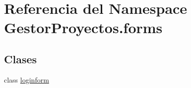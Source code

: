 \hypertarget{namespace_gestor_proyectos_1_1forms}{}\section{Referencia del Namespace Gestor\+Proyectos.\+forms}
\label{namespace_gestor_proyectos_1_1forms}
\subsection*{Clases}
\begin{DoxyCompactItemize}
\item 
class \hyperlink{class_gestor_proyectos_1_1forms_1_1loginform}{loginform}
\end{DoxyCompactItemize}
